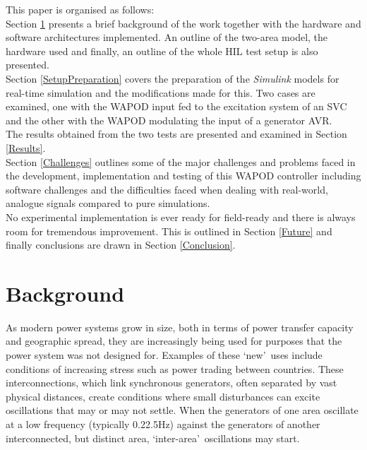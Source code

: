 \documentclass[journal]{IEEEtran}
\begin{document}
This paper is organised as follows:\\

Section \ref{Background} presents a brief background of the work together with the hardware and software architectures implemented. An outline of the two-area model, the hardware used and finally, an outline of the whole HIL test setup is also presented.\\

Section \ref{SetupPreparation} covers the preparation of the \emph{Simulink} models for real-time simulation and the modifications made for this. Two cases are examined, one with the WAPOD input fed to the excitation system of an SVC and the other with the WAPOD modulating the input of a generator AVR.\\

The results obtained from the two tests are presented and examined in Section \ref{Results}.\\

Section \ref{Challenges} outlines some of the major challenges and problems faced in the development, implementation and testing of this WAPOD controller including software challenges and the difficulties faced when dealing with real-world, analogue signals compared to pure simulations.\\

No experimental implementation is ever ready for field-ready and there is always room for tremendous improvement. This is outlined in Section \ref{Future} and finally conclusions are drawn in Section \ref{Conclusion}.





 

\section{Background}\label{Background}
As modern power systems grow in size, both in terms of power transfer capacity and geographic spread, they are increasingly being used for purposes that the power system was not designed for. Examples of these \textquoteleft new\textquoteright ~uses include conditions of increasing stress such as power trading between countries. These interconnections, which link synchronous generators, often separated by vast physical distances, create conditions where small disturbances can excite oscillations that may or may not settle. When the generators of one area oscillate at a low frequency (typically 0.2\textendash 2.5Hz) against the generators of another interconnected, but distinct area, \textquoteleft inter-area\textquoteright ~oscillations may start.\\
\end{document}
